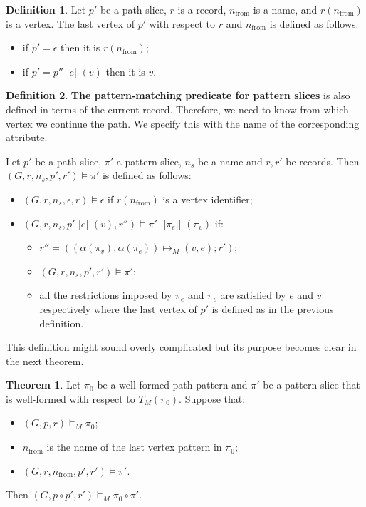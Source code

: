 \documentclass[14pt]{constructor-thesis}
\theoremstyle{definition}
\newtheorem{theorem}{Theorem}
\newtheorem{definition}{Definition}
\newcommand{\pathhop}[3]{#1 \texttt{-[} #2 \texttt{]-} (#3)}
\newcommand{\patternhop}[3]{#1 \texttt{-[[} #2 \texttt{]]-} (#3)}
\begin{document}
\begin{definition}
  Let $p'$ be a path slice, $r$ is a record, $n_{\mathrm{from}}$ is a name, and $r(n_{\mathrm{from}})$ is a vertex. The last vertex of $p'$ with respect to $r$ and $n_{\mathrm{from}}$ is defined as follows:
  \begin{itemize}
    \item if $p' = \epsilon$ then it is $r(n_{\mathrm{from}})$;
    \item if $p' = \pathhop{p''}{e}{v}$ then it is $v$.
  \end{itemize}
\end{definition}

\begin{definition}
  \textbf{The pattern-matching predicate for pattern slices} is also defined in terms of the current record. Therefore, we need to know from which vertex we continue the path. We specify this with the name of the corresponding attribute.

  Let $p'$ be a path slice, $\pi'$ a pattern slice, $n_{s}$ be a name and $r, r'$ be records. Then $(G, r, n_{s}, p', r') \models \pi'$ is defined as follows:
  \begin{itemize}
    \item $(G, r, n_{s}, \epsilon, r) \models \epsilon$ if $r(n_{\mathrm{from}})$ is a vertex identifier;
    \item $(G, r, n_{s}, \pathhop{p'}{e}{v}, r'') \models \patternhop{\pi'}{\pi_e}{\pi_v}$ if:
    \begin{itemize}
      \item $r'' = ((\alpha(\pi_v), \alpha(\pi_e)) \mapsto_M (v, e); r')$;
      \item $(G, r, n_{s}, p', r') \models \pi'$;
      \item all the restrictions imposed by $\pi_e$ and $\pi_v$ are satisfied by $e$ and $v$ respectively where the last vertex of $p'$ is defined as in the previous definition.
    \end{itemize} 
  \end{itemize}
\end{definition}

This definition might sound overly complicated but its purpose becomes clear in the next theorem.

\begin{theorem}
  Let $\pi_0$ be a well-formed path pattern and $\pi'$ be a pattern slice that is well-formed with respect to $T_M(\pi_0)$. Suppose that:
  \begin{itemize}
    \item $(G, p, r) \models_M \pi_0$;
    \item $n_{\mathrm{from}}$ is the name of the last vertex pattern in $\pi_0$;
    \item $(G, r, n_{\mathrm{from}}, p', r') \models \pi'$.
  \end{itemize}
  Then $(G, p \circ p', r') \models_M \pi_0 \circ \pi'$.
\end{theorem}
\end{document}
